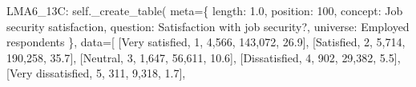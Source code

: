\documentclass[
  11pt,
  a4paper,
]{article}
\newenvironment{Shaded}{\begin{snugshade}}{\end{snugshade}}
\newcommand{\NormalTok}[1]{\textcolor[rgb]{0.00,0.23,0.31}{#1}}
\newcommand{\OperatorTok}[1]{\textcolor[rgb]{0.37,0.37,0.37}{#1}}
\newcommand{\StringTok}[1]{\textcolor[rgb]{0.13,0.47,0.30}{#1}}
\newcommand{\VariableTok}[1]{\textcolor[rgb]{0.07,0.07,0.07}{#1}}
\begin{document}
\begin{Shaded}
\begin{Highlighting}[]
            \StringTok{\textquotesingle{}LMA6\_13C\textquotesingle{}}\NormalTok{: }\VariableTok{self}\NormalTok{.\_create\_table(}
\NormalTok{                meta}\OperatorTok{=}\NormalTok{\{}
                    \StringTok{\textquotesingle{}length\textquotesingle{}}\NormalTok{: }\StringTok{\textquotesingle{}1.0\textquotesingle{}}\NormalTok{, }\StringTok{\textquotesingle{}position\textquotesingle{}}\NormalTok{: }\StringTok{\textquotesingle{}100\textquotesingle{}}\NormalTok{,}
                    \StringTok{\textquotesingle{}concept\textquotesingle{}}\NormalTok{: }\StringTok{\textquotesingle{}Job security satisfaction\textquotesingle{}}\NormalTok{,}
                    \StringTok{\textquotesingle{}question\textquotesingle{}}\NormalTok{: }\StringTok{\textquotesingle{}Satisfaction with job security?\textquotesingle{}}\NormalTok{,}
                    \StringTok{\textquotesingle{}universe\textquotesingle{}}\NormalTok{: }\StringTok{\textquotesingle{}Employed respondents\textquotesingle{}}
\NormalTok{                \},}
\NormalTok{                data}\OperatorTok{=}\NormalTok{[}
\NormalTok{                    [}\StringTok{\textquotesingle{}Very satisfied\textquotesingle{}}\NormalTok{, }\StringTok{\textquotesingle{}1\textquotesingle{}}\NormalTok{, }\StringTok{\textquotesingle{}4,566\textquotesingle{}}\NormalTok{, }\StringTok{\textquotesingle{}143,072\textquotesingle{}}\NormalTok{, }\StringTok{\textquotesingle{}26.9\textquotesingle{}}\NormalTok{],}
\NormalTok{                    [}\StringTok{\textquotesingle{}Satisfied\textquotesingle{}}\NormalTok{, }\StringTok{\textquotesingle{}2\textquotesingle{}}\NormalTok{, }\StringTok{\textquotesingle{}5,714\textquotesingle{}}\NormalTok{, }\StringTok{\textquotesingle{}190,258\textquotesingle{}}\NormalTok{, }\StringTok{\textquotesingle{}35.7\textquotesingle{}}\NormalTok{],}
\NormalTok{                    [}\StringTok{\textquotesingle{}Neutral\textquotesingle{}}\NormalTok{, }\StringTok{\textquotesingle{}3\textquotesingle{}}\NormalTok{, }\StringTok{\textquotesingle{}1,647\textquotesingle{}}\NormalTok{, }\StringTok{\textquotesingle{}56,611\textquotesingle{}}\NormalTok{, }\StringTok{\textquotesingle{}10.6\textquotesingle{}}\NormalTok{],}
\NormalTok{                    [}\StringTok{\textquotesingle{}Dissatisfied\textquotesingle{}}\NormalTok{, }\StringTok{\textquotesingle{}4\textquotesingle{}}\NormalTok{, }\StringTok{\textquotesingle{}902\textquotesingle{}}\NormalTok{, }\StringTok{\textquotesingle{}29,382\textquotesingle{}}\NormalTok{, }\StringTok{\textquotesingle{}5.5\textquotesingle{}}\NormalTok{],}
\NormalTok{                    [}\StringTok{\textquotesingle{}Very dissatisfied\textquotesingle{}}\NormalTok{, }\StringTok{\textquotesingle{}5\textquotesingle{}}\NormalTok{, }\StringTok{\textquotesingle{}311\textquotesingle{}}\NormalTok{, }\StringTok{\textquotesingle{}9,318\textquotesingle{}}\NormalTok{, }\StringTok{\textquotesingle{}1.7\textquotesingle{}}\NormalTok{],}

\end{Highlighting}
\end{Shaded}
\end{document}
